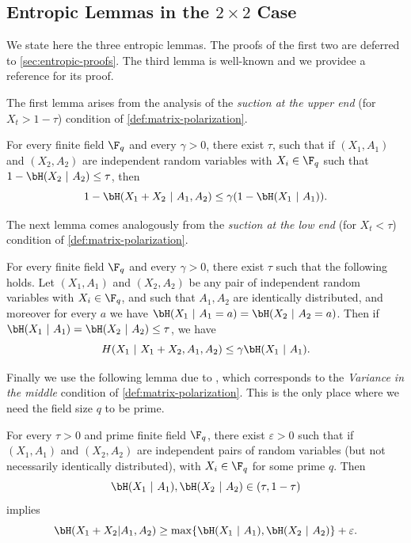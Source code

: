 \documentclass[11pt]{article}
\begin{document}
\subsection{Entropic Lemmas in the $2 \times 2$ Case}
\label{sec:entropic-statements}


We state here the three entropic lemmas. The proofs of the first two are deferred to \cref{sec:entropic-proofs}. The third lemma is well-known and we providee a reference for its proof.

The first lemma arises from the analysis of the \emph{suction at the upper end} (for $X_t > 1 - \tau$) condition of \cref{def:matrix-polarization}.
\begin{lemma}
	\label{lem:suc-upr-cond}
	For every finite field $\F_q$ and every $\gamma > 0$, there exist $\tau$, such that if $(X_1, A_1)$ and $(X_2, A_2)$ are independent random variables with $X_i \in \F_q$ such that 
	$1 - \bH(X_2 ~|~ A_2) \leq \tau$, then
	\begin{equation*}
		1 - \bH(X_1 + X_2 ~|~ A_1, A_2) \leq \gamma (1 - \bH(X_1 ~|~ A_1)).
	\end{equation*}
\end{lemma}

The next lemma comes analogously from the \emph{suction at the low end} (for $X_t < \tau$) condition of \cref{def:matrix-polarization}.
\begin{lemma}
	\label{lem:suc-lwr-cond}
	For every finite field $\F_q$ and every $\gamma > 0$, there exist $\tau$ such that the following holds.
	Let $(X_1, A_1)$ and $(X_2, A_2)$  be any pair of independent random variables with $X_i \in \F_q$, and such that $A_1, A_2$ are identically distributed, and moreover for every $a$ we have $\bH(X_1 ~|~ A_1 = a) = \bH(X_2 ~|~ A_2 = a)$. Then if $\bH(X_1 ~|~ A_1) = \bH(X_2 ~|~ A_2) \leq \tau$, we have
	\begin{equation*}
		H(X_1 ~|~ X_1 + X_2, A_1, A_2) \leq \gamma \bH(X_1 ~|~ A_1).
	\end{equation*}
\end{lemma}

Finally we use the following lemma due to \cite[Lemma 4.2]{sasoglu-book}, which corresponds to the \emph{Variance in the middle} condition of \cref{def:matrix-polarization}.
This is the only place where we need the field size $q$ to be prime.

\begin{lemma}
	\label{lem:2x2-middle}
	For every $\tau > 0$ and prime finite field $\F_q$, there exist $\varepsilon > 0$ such that if $(X_1, A_1)$ and $(X_2, A_2)$ are independent pairs of random variables (but not necessarily identically distributed), with $X_i \in \F_q$ for some prime $q$. Then
	\begin{equation*}
		\bH(X_1 ~|~ A_1), \bH(X_2~|~ A_2) \in (\tau, 1-\tau)
	\end{equation*}
	implies
	\begin{equation*}
		\bH(X_1 + X_2|A_1, A_2) \geq \max\{\bH(X_1 ~|~ A_1), \bH(X_2 ~|~ A_2)\} + \varepsilon.
	\end{equation*}
\end{lemma}
\end{document}
